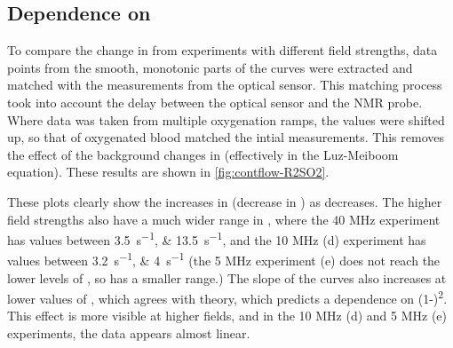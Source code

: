 \subsection{Dependence on \SOtwo}
\label{contflow:fieldcomp}
To compare the change in \Ttwo from experiments with different field strengths, data points from the smooth, monotonic parts of the \Ttwo curves were extracted and matched with the \SOtwo measurements from the optical sensor.
This matching process took into account the delay between the optical sensor and the NMR probe.
Where data was taken from multiple oxygenation ramps, the \Ttwo values were shifted up, so that \Ttwo of oxygenated blood matched the intial measurements.
This removes the effect of the background changes in \Ttwo (effectively \TtwoO in the Luz-Meiboom equation).
These results are shown in \autoref{fig:contflow-R2SO2}.


These plots clearly show the increases in \Rtwo (decrease in \Ttwo) as \SOtwo decreases.
The higher field strengths also have a much wider range in \Rtwo, where the 40 MHz experiment has \Rtwo values between \SIlist{3.5;13.5}{s^{-1}}, and the 10 MHz (d) experiment has values between \SIlist{3.2;4}{s^{-1}} (the 5 MHz experiment (e) does not reach the lower levels of \SOtwo, so has a smaller range.)
The slope of the \Rtwo curves also increases at lower values of \SOtwo, which agrees with theory, which predicts a dependence on (1-\SOtwo)\textsuperscript{2}.
This effect is more visible at higher fields, and in the 10 MHz (d) and 5 MHz (e) experiments, the data appears almost linear.


